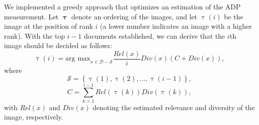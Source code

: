 \documentclass{acm_proc_article-me11_tweaked}
\begin{document}
We implemented a greedy approach that optimizes an estimation of the ADP measurement. 
Let $\pmb\uptau$ denote an ordering of the images, and let $\uptau(i)$ be the image at the position of rank $i$ (a lower number indicates an image with a higher rank).
With the top $ i - 1 $ documents established, we can derive that the $i$th image should be decided as follows:
\begin{equation}
 \displaystyle
  \uptau(i) = \text{arg max}_{x \in \mathscr{D} - \mathscr{S} } \frac{Rel(x)}{i} Div(x) ( C + Div(x) ),
\end{equation}
where
\begin{equation}
\mathscr{S} = \left\{\uptau(1), \uptau(2), \ldots , \uptau(i - 1)\right\} ,
\end{equation}
\begin{equation}
C = \sum^{i-1}_{k=1} Rel(\uptau(k)) Div(\uptau(k)),
\end{equation}
with $Rel(x)$ and $Div(x)$ denoting the estimated relevance and diversity of the image, respectively.

%
\end{document}
